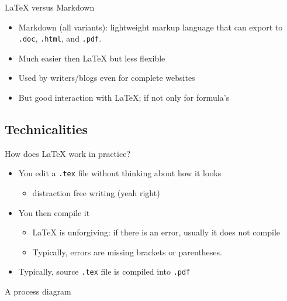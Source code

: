 \documentclass[ignorenonframetext]{beamer}
\begin{document}
{\begin{frame}{\LaTeX{} versus Markdown}
	\begin{itemize}
		\item Markdown (all variants): lightweight markup language that can export to \texttt{.doc}, \texttt{.html}, and \texttt{.pdf}.
		\newline
		\item Much easier then \LaTeX{} but less flexible
		\newline
		\item Used by writers/blogs even for complete websites
		\newline
		\item But good interaction with \LaTeX{}; if not only for formula's
	\end{itemize}
\end{frame}

\subsection{Technicalities}\label{technicalities}

\begin{frame}[fragile]{How does \LaTeX{} work in practice?}

\begin{itemize}
\item
  You edit a \texttt{.tex} file without thinking about how it looks

  \begin{itemize}
  \item
    distraction free writing (yeah right)
  \end{itemize}
\item
  You then compile it

  \begin{itemize}
  \item
    \LaTeX{} is unforgiving: if there is an error, usually it does not
    compile
  \item
    Typically, errors are missing brackets or parentheses.
  \end{itemize}
\item
  Typically, source \texttt{.tex} file is compiled into \texttt{.pdf}
\end{itemize}

\end{frame}

\begin{frame}{A process diagram}


\end{frame}}
\end{document}
